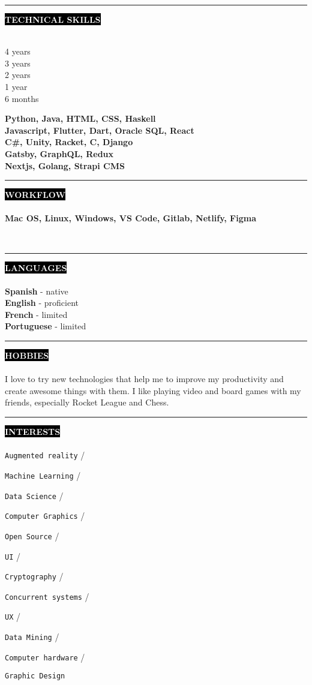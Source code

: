 \documentclass[10pt,A4]{article}
\newcounter{a}
\newcounter{b}
\newcounter{c}
\newcommand{\cvsection}[1] {
	\textcolor{white}{\MakeUppercase{\textbf{#1}}}
}
\newcommand{\cvsect}[1]{
	\colorbox{black}{{\cvsection{#1}}}\\\\%
}
\newcommand{\slashsep}{
	\hspace{2mm}/\hspace{2mm}
}
\begin{document}
	\begin{minipage}[t]{0.56\textwidth}\hrule height 0pt width 0pt%
	\cvsect{Technical Skills}
	\begin{minipage}[t]{0.2\textwidth}%
		4 years\\ 3 years \\ 2 years \\ 1 year \\ 6 months 
	\end{minipage}%
	\begin{minipage}[t]{0.7\textwidth}%
		\textbf{Python, Java, HTML, CSS, Haskell} \\ \textbf{Javascript, Flutter, Dart, Oracle SQL, React} \\ \textbf{C\#, Unity, Racket, C, Django} \\ \textbf{Gatsby, GraphQL, Redux} \\ \textbf{Nextjs, Golang, Strapi CMS}
	\end{minipage}%
	\end{minipage}%
	\hspace{1cm}
	\begin{minipage}[t]{0.4\textwidth}\hrule height 0pt width 0pt%
		\cvsect{Workflow}
		\textbf{Mac OS, Linux, Windows, VS Code, Gitlab, Netlify, Figma}
	\end{minipage}%
	\hspace{2cm}
	\\

	\begin{minipage}[t]{0.3\textwidth}\hrule height 0pt width 0pt%
		\cvsect{Languages}
		\textbf{Spanish} - native\\
		\textbf{English} - proficient\\
		\textbf{French} - limited\\
		\textbf{Portuguese} - limited\\
	\end{minipage}%
	\hspace{0cm}
	\begin{minipage}[t]{0.3\textwidth}\hrule height 0pt width 0pt%
		\cvsect{Hobbies}
		I love to try new technologies that help me to improve my productivity and create awesome things with them. 
		I like playing video and board games with my friends, especially Rocket League and Chess.
	\end{minipage}%
	\hspace{2cm}
	\begin{minipage}[t]{0.3\textwidth}\hrule height 0pt width 0pt%
		\cvsect{Interests}
		\texttt{Augmented reality}\slashsep
		\texttt{Machine Learning}\slashsep
		\texttt{Data Science}\slashsep
		\texttt{Computer Graphics}\slashsep
		\texttt{Open Source}\slashsep
		\texttt{UI}\slashsep
		\texttt{Cryptography}\slashsep
		\texttt{Concurrent systems}\slashsep
		\texttt{UX}\slashsep
		\texttt{Data Mining} \slashsep
		\texttt{Computer hardware} \slashsep
		\texttt{Graphic Design}


	\end{minipage}%
\end{document}
